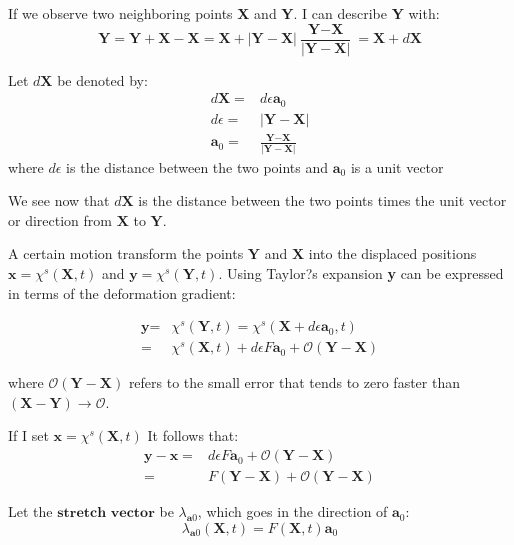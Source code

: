 If we observe two neighboring points \textbf{X} and \textbf{Y}. I can describe \textbf{Y} with:
\begin{equation}
\textbf{Y} = \textbf{Y} + \textbf{X} - \textbf{X} = \textbf{X} + |\textbf{Y} - \textbf{X}| \frac{\textbf{Y} - \textbf{X}}{|\textbf{Y} - \textbf{X}|} = \textbf{X} + d\textbf{X}
\end{equation}

Let $d\textbf{X}$ be denoted by:
\begin{align}
d\textbf{X} =& d\epsilon \textbf{a}_0\\
d\epsilon =& |\textbf{Y} - \textbf{X}| \\
\textbf{a}_0 =& \frac{\textbf{Y} - \textbf{X}}{|\textbf{Y} - \textbf{X}|}
\end{align}
where $d\epsilon$ is the distance between the two points and $\textbf{a}_0$ is a unit vector 

We see now that $d\textbf{X}$ is the distance between the two points times the unit vector or direction from $\textbf{X}$ to $\textbf{Y}$.
\newline

A certain motion transform the points $\textbf{Y}$ and $\textbf{X}$ into the displaced positions $\textbf{x} = \chi^s(\textbf{X},t)$ and $\textbf{y} = \chi^s(\textbf{Y},t)$. Using Taylor?s expansion \textbf{y} can be expressed in terms of the deformation gradient:

\begin{align}
\textbf{y} =& \chi^s(\textbf{Y},t) = \chi^s(\textbf{X} + d\epsilon \textbf{a}_0,t) \\
=& \chi^s(\textbf{X},t) + d\epsilon F \textbf{a}_0 + \mathcal{O}(\textbf{Y}-\textbf{X}) 
\end{align}

where $\mathcal{O} (\textbf{Y}-\textbf{X})$ refers to the small error that tends to zero faster than $(\textbf{X} - \textbf{Y}) \rightarrow \mathcal{O}$. \newline

If I set $\textbf{x} = \chi^s(\textbf{X},t)$  It follows that:
\begin{align}
\textbf{y} - \textbf{x} =&  d\epsilon F \textbf{a}_0 + \mathcal{O}(\textbf{Y}-\textbf{X}) \\
=& F(\textbf{Y} - \textbf{X}) + \mathcal{O}(\textbf{Y}-\textbf{X}) 
\end{align}

Let the $\textbf{stretch vector}$ be $\lambda_{\textbf{a}0}$, which goes in the direction of $\textbf{a}_0$: 
\begin{equation}
\lambda_{\textbf{a}0}(\textbf{X},t) = F(\textbf{X},t)\textbf{a}_0 
\end{equation}

